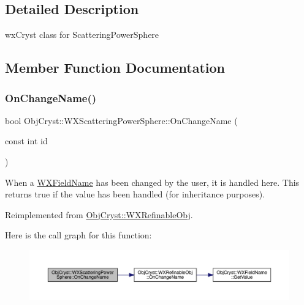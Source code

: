 \subsection{Detailed Description}
wx\+Cryst class for Scattering\+Power\+Sphere 

\subsection{Member Function Documentation}
\mbox{\label{class_obj_cryst_1_1_w_x_scattering_power_sphere_a7f3614f0711d1a2ef1fca4a60789129e}} 
\subsubsection{\texorpdfstring{OnChangeName()}{OnChangeName()}}
{\footnotesize\ttfamily bool Obj\+Cryst\+::\+W\+X\+Scattering\+Power\+Sphere\+::\+On\+Change\+Name (\begin{DoxyParamCaption}\item[{const int}]{id }\end{DoxyParamCaption})\hspace{0.3cm}{\ttfamily [virtual]}}

When a \mbox{\hyperlink{class_obj_cryst_1_1_w_x_field_name}{W\+X\+Field\+Name}} has been changed by the user, it is handled here. This returns true if the value has been handled (for inheritance purposes). 

Reimplemented from \mbox{\hyperlink{class_obj_cryst_1_1_w_x_refinable_obj_a1a13aaa3b69044cff0d1c257dea2acb0}{Obj\+Cryst\+::\+W\+X\+Refinable\+Obj}}.

Here is the call graph for this function\+:
\nopagebreak
\begin{figure}[H]
\begin{center}
\leavevmode
\includegraphics[width=350pt]{class_obj_cryst_1_1_w_x_scattering_power_sphere_a7f3614f0711d1a2ef1fca4a60789129e_cgraph}
\end{center}
\end{figure}
\mbox{\label{class_obj_cryst_1_1_w_x_scattering_power_sphere_a2e1eed3ea3e179e57621251cc844be3e}} 
